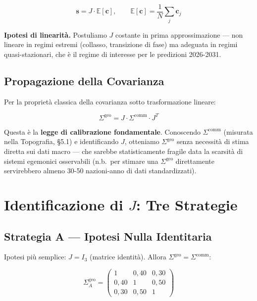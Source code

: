 \[
\mathbf{s} = J \cdot \mathbb{E}[\mathbf{c}], \qquad \mathbb{E}[\mathbf{c}] = \frac{1}{N}\sum_j \mathbf{c}_j
\]

\Hypoth{} \textbf{Ipotesi di linearità.} Postuliamo \(J\) costante in
prima approssimazione --- non lineare in regimi estremi (collasso,
transizione di fase) ma adeguata in regimi quasi-stazionari, che è il
regime di interesse per le predizioni 2026-2031.

\subsection{Propagazione della
Covarianza}\label{propagazione-della-covarianza}

Per la proprietà classica della covarianza sotto trasformazione lineare:

\[
\boxed{\Sigma^{\text{geo}} = J \cdot \Sigma^{\text{comm}} \cdot J^T}
\]

Questa è la \textbf{legge di calibrazione fondamentale}. Conoscendo
\(\Sigma^{\text{comm}}\) (misurata nella Topografia, \S{}5.1) e
identificando \(J\), otteniamo \(\Sigma^{\text{geo}}\) senza necessità
di stima diretta sui dati macro --- che sarebbe statisticamente fragile
data la scarsità di sistemi egemonici osservabili (n.b.~per stimare una
\(\Sigma^{\text{geo}}\) direttamente servirebbero almeno 30-50
nazioni-anno di dati standardizzati).



\section{\texorpdfstring{Identificazione di \(J\): Tre
Strategie}{Identificazione di J: Tre Strategie}}\label{identificazione-di-j-tre-strategie}

\subsection{Strategia A --- Ipotesi Nulla
Identitaria}\label{strategia-a-ipotesi-nulla-identitaria}

Ipotesi più semplice: \(J = I_3\) (matrice identità). Allora
\(\Sigma^{\text{geo}} = \Sigma^{\text{comm}}\):

\[
\Sigma^{\text{geo}}_A = \begin{pmatrix} 1 & 0{,}40 & 0{,}30 \\ 0{,}40 & 1 & 0{,}50 \\ 0{,}30 & 0{,}50 & 1 \end{pmatrix}
\]


